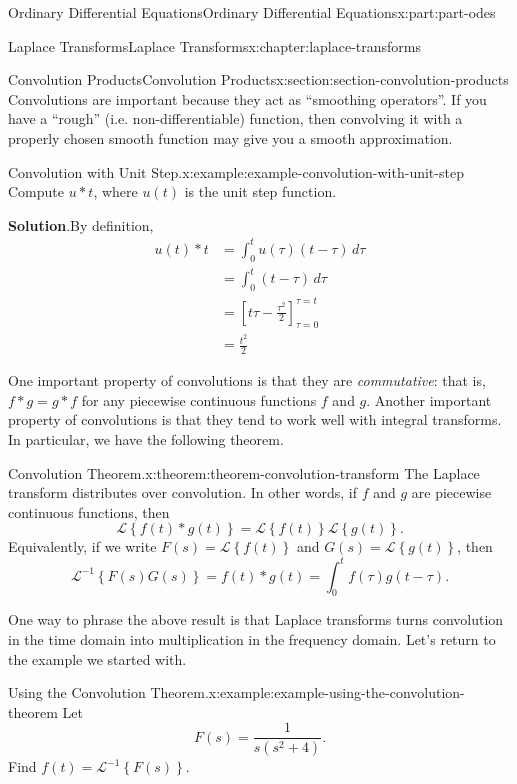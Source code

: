 \documentclass[twoside,10pt,]{book}
\newcommand{\blocktitlefont}{\relax}
\numberwithin{equation}{part}
\newcommand{\Int}[2]{\int_{#1}^{#2}}
\newcommand{\Laplace}[1]{\mathcal{L}\left\{#1\right\}}
\newcommand{\iLaplace}[1]{\mathcal{L}^{-1}\left\{#1\right\}}
\newcommand{\amp}{&}
\begin{document}
\begin{partptx}{Ordinary Differential Equations}{}{Ordinary Differential Equations}{}{}{x:part:part-odes}
\begin{chapterptx}{Laplace Transforms}{}{Laplace Transforms}{}{}{x:chapter:laplace-transforms}
\begin{sectionptx}{Convolution Products}{}{Convolution Products}{}{}{x:section:section-convolution-products}
Convolutions are important because they act as ``smoothing operators''. If you have a ``rough'' (i.e. non-differentiable) function, then convolving it with a properly chosen smooth function may give you a smooth approximation.%
\begin{example}{Convolution with Unit Step.}{x:example:example-convolution-with-unit-step}%
Compute \(u\ast t\), where \(u(t)\) is the unit step function.%
\par\smallskip%
\noindent\textbf{\blocktitlefont Solution}.\hypertarget{g:solution:idp105548816754592}{}\quad{}By definition,%
\begin{align*}
u(t)\ast t \amp= \Int{0}{t}u(\tau)(t-\tau)\,d\tau \\
\amp= \Int{0}{t}(t-\tau)\,d\tau \\
\amp= \left[t\tau-\frac{\tau^{2}}{2}\right]_{\tau=0}^{\tau=t} \\
\amp= \frac{t^{2}}{2}
\end{align*}
%
\end{example}
One important property of convolutions is that they are \emph{commutative}: that is, \(f\ast g = g\ast f\) for any piecewise continuous functions \(f\) and \(g\). Another important property of convolutions is that they tend to work well with integral transforms. In particular, we have the following theorem.%
\begin{theorem}{Convolution Theorem.}{}{x:theorem:theorem-convolution-transform}%
The Laplace transform distributes over convolution. In other words, if \(f\) and \(g\) are piecewise continuous functions, then%
\begin{equation*}
\Laplace{f(t)\ast g(t)} = \Laplace{f(t)}\Laplace{g(t)}.
\end{equation*}
Equivalently, if we write \(F(s) = \Laplace{f(t)}\) and \(G(s) = \Laplace{g(t)}\), then%
\begin{equation*}
\iLaplace{F(s)G(s)} = f(t)\ast g(t) = \Int{0}{t}f(\tau)g(t-\tau).
\end{equation*}
%
\end{theorem}
One way to phrase the above result is that Laplace transforms turns convolution in the time domain into multiplication in the frequency domain. Let's return to the example we started with.%
\begin{example}{Using the Convolution Theorem.}{x:example:example-using-the-convolution-theorem}%
Let%
\begin{equation*}
F(s) = \frac{1}{s(s^{2}+4)}.
\end{equation*}
Find \(f(t) = \iLaplace{F(s)}\).%

\end{example}
\end{sectionptx}
\end{chapterptx}
\end{partptx}
\end{document}

